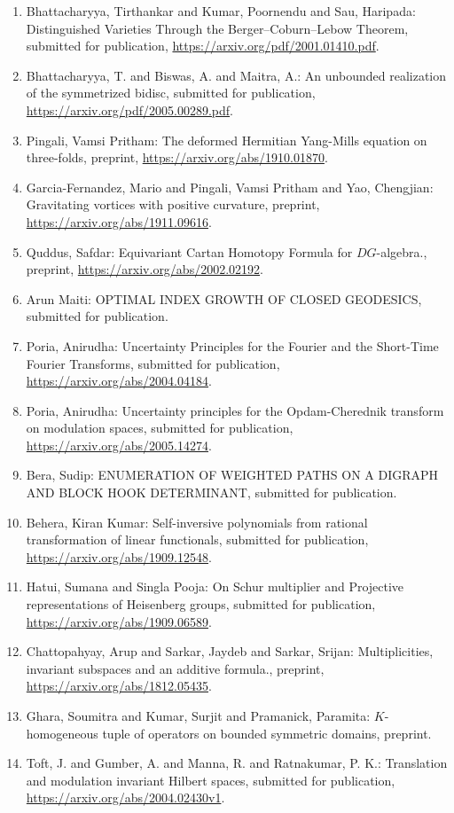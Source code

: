 \begin{enumerate}
\item Bhattacharyya, Tirthankar and Kumar, Poornendu and Sau, Haripada: Distinguished Varieties Through the Berger--Coburn--Lebow Theorem, submitted for publication, \url{https://arxiv.org/pdf/2001.01410.pdf}.
\item Bhattacharyya, T. and  Biswas, A. and Maitra, A.: An unbounded realization of the symmetrized bidisc, submitted for publication, \url{https://arxiv.org/pdf/2005.00289.pdf}.
\item Pingali, Vamsi Pritham: The deformed Hermitian Yang-Mills equation on three-folds, preprint, \url{https://arxiv.org/abs/1910.01870}.
\item Garcia-Fernandez, Mario and Pingali, Vamsi Pritham and Yao, Chengjian: Gravitating vortices with positive curvature, preprint, \url{https://arxiv.org/abs/1911.09616}.
\item Quddus, Safdar: Equivariant Cartan Homotopy Formula for $DG$-algebra., preprint, \url{https://arxiv.org/abs/2002.02192}.
\item Arun Maiti: OPTIMAL INDEX GROWTH OF CLOSED GEODESICS, submitted for publication.
\item Poria, Anirudha: Uncertainty Principles for the Fourier and the Short-Time Fourier Transforms, submitted for publication, \url{https://arxiv.org/abs/2004.04184}.
\item Poria, Anirudha: Uncertainty principles for the Opdam-Cherednik transform on modulation spaces, submitted for publication, \url{https://arxiv.org/abs/2005.14274}.
\item Bera, Sudip: ENUMERATION OF WEIGHTED PATHS ON A DIGRAPH AND BLOCK HOOK DETERMINANT, submitted for publication.
\item Behera, Kiran Kumar: Self-inversive polynomials from rational transformation of linear functionals, submitted for publication, \url{https://arxiv.org/abs/1909.12548}.
\item Hatui, Sumana and Singla Pooja: On Schur multiplier and Projective representations of Heisenberg groups, submitted for publication, \url{https://arxiv.org/abs/1909.06589}.
\item Chattopahyay, Arup and Sarkar, Jaydeb and Sarkar, Srijan: Multiplicities, invariant subspaces and an additive formula., preprint, \url{https://arxiv.org/abs/1812.05435}.
\item Ghara, Soumitra and Kumar, Surjit and Pramanick, Paramita: $K$-homogeneous tuple of operators on bounded symmetric domains, preprint.
\item Toft, J. and Gumber, A. and Manna, R. and Ratnakumar, P. K.: Translation and modulation invariant Hilbert spaces, submitted for publication, \url{https://arxiv.org/abs/2004.02430v1}.
\end{enumerate}

